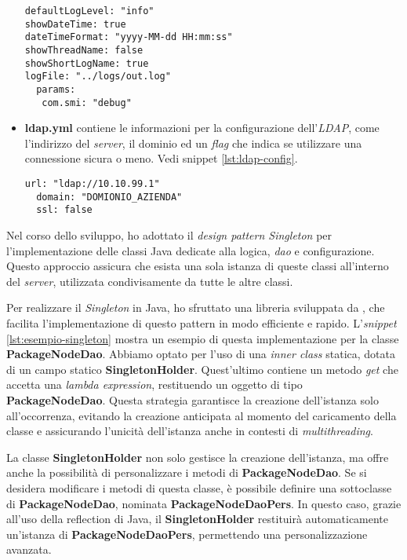 \begin{itemize}
\begin{lstlisting}[caption={Esempio di configurazione del \textit{logger.yml}.},captionpos=b, label={lst:logger-config}]
defaultLogLevel: "info"
showDateTime: true
dateTimeFormat: "yyyy-MM-dd HH:mm:ss"
showThreadName: false
showShortLogName: true
logFile: "../logs/out.log"
  params:
   com.smi: "debug"
  \end{lstlisting}
 \item \textbf{ldap.yml} contiene le informazioni per la configurazione dell'\textit{LDAP}, come l'indirizzo del \textit{server}, 
 il dominio ed un \textit{flag} che indica se utilizzare una connessione sicura o meno. Vedi snippet \ref*{lst:ldap-config}.
  \begin{lstlisting}[caption={Esempio di configurazione dell'\textit{ldap.yml}.},captionpos=b, label={lst:ldap-config}]
  url: "ldap://10.10.99.1"
  domain: "DOMIONIO_AZIENDA"
  ssl: false
  \end{lstlisting}
\end{itemize}

Nel corso dello sviluppo, ho adottato il \textit{design pattern Singleton} per l'implementazione delle classi Java 
dedicate alla logica, \textit{dao} e configurazione. Questo approccio assicura che esista una sola istanza di queste classi 
all'interno del \textit{server}, utilizzata condivisamente da tutte le altre classi.

Per realizzare il \textit{Singleton} in Java, ho sfruttato una libreria sviluppata da \azienda{}, che facilita 
l'implementazione di questo pattern in modo efficiente e rapido. L'\textit{snippet} \ref*{lst:esempio-singleton} mostra un esempio 
di questa implementazione per la classe \textbf{PackageNodeDao}. Abbiamo optato per l'uso di una \textit{inner class} statica, 
dotata di un campo statico \textbf{SingletonHolder}. Quest'ultimo contiene un metodo \textit{get} che accetta una \textit{lambda expression}, 
restituendo un oggetto di tipo \textbf{PackageNodeDao}. Questa strategia garantisce la creazione dell'istanza solo all'occorrenza, 
evitando la creazione anticipata al momento del caricamento della classe e assicurando l'unicità dell'istanza anche in contesti di \textit{multithreading}.

La classe \textbf{SingletonHolder} non solo gestisce la creazione dell'istanza, ma offre anche la possibilità di personalizzare i metodi 
di \textbf{PackageNodeDao}. Se si desidera modificare i metodi di questa classe, è possibile definire una sottoclasse di \textbf{PackageNodeDao}, 
nominata \textbf{PackageNodeDaoPers}. In questo caso, grazie all'uso della \gls{reflection} di Java, 
il \textbf{SingletonHolder} restituirà automaticamente un'istanza di \textbf{PackageNodeDaoPers}, permettendo una personalizzazione avanzata.


